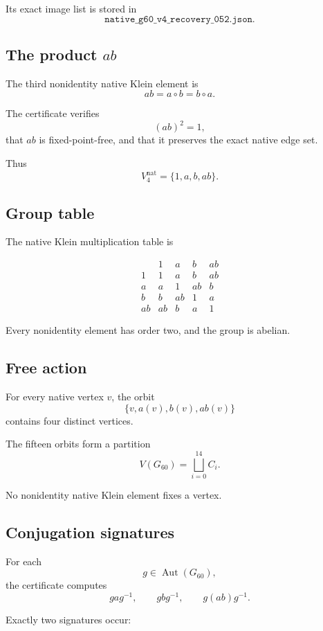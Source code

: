 Its exact image list is stored in
\[
\texttt{native\_g60\_v4\_recovery\_052.json}.
\]

\subsection{The product \(ab\)}

The third nonidentity native Klein element is
\[
ab=a\circ b=b\circ a.
\]

The certificate verifies
\[
(ab)^2=1,
\]
that \(ab\) is fixed-point-free, and that it preserves the exact native
edge set.

Thus
\[
V_4^{\mathrm{nat}}
=
\{1,a,b,ab\}.
\]

\subsection{Group table}

The native Klein multiplication table is

\[
\begin{array}{c|cccc}
 & 1 & a & b & ab\\
\hline
1  & 1  & a  & b  & ab\\
a  & a  & 1  & ab & b\\
b  & b  & ab & 1  & a\\
ab & ab & b  & a  & 1
\end{array}
\]

Every nonidentity element has order two, and the group is abelian.

\subsection{Free action}

For every native vertex \(v\), the orbit
\[
\{v,a(v),b(v),ab(v)\}
\]
contains four distinct vertices.

The fifteen orbits form a partition
\[
V(G_{60})
=
\bigsqcup_{i=0}^{14}C_i.
\]

No nonidentity native Klein element fixes a vertex.

\subsection{Conjugation signatures}

For each
\[
g\in\operatorname{Aut}(G_{60}),
\]
the certificate computes
\[
gag^{-1},
\qquad
gbg^{-1},
\qquad
g(ab)g^{-1}.
\]

Exactly two signatures occur:

